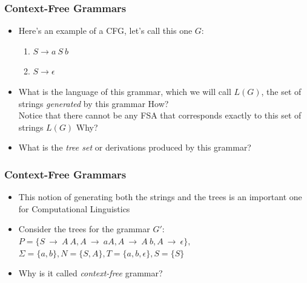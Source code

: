 \begin{frame}
\frametitle{Context-Free Grammars}
\begin{itemize}
\item Here's an example of a CFG, let's call this one $G$:
\begin{enumerate}
\item $S \rightarrow a\ S\ b$
\item $S \rightarrow \epsilon$
\end{enumerate}
\item What is the language of this grammar, which we will call $L(G)$, the set of strings {\em generated} by this grammar {\color{red} How?} \\
Notice that there cannot be any FSA that corresponds exactly to this set of strings $L(G)$ {\color{red} Why?}
\item What is the {\em tree set} or derivations produced by this grammar?
\end{itemize}

\end{frame}

\begin{frame}
\frametitle{Context-Free Grammars}
\begin{itemize}
\item This notion of generating both the strings and the trees is an important one for Computational Linguistics
\item Consider the trees for the grammar $G'$: $P = \{S~\rightarrow~A~A, A~\rightarrow~a A, A~\rightarrow~A~b, A~\rightarrow~\epsilon \}, $\\
$\Sigma = \{a,b\}, N = \{S,A\}, T = \{a,b,\epsilon\}, S=\{S\}$

\item Why is it called {\em context-free} grammar?
\end{itemize}

\end{frame}


